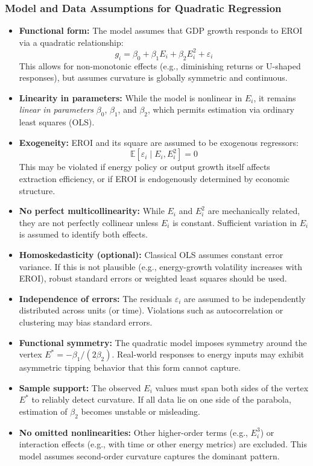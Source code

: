 \documentclass[a4paper,12pt]{article}
\begin{document}
\subsubsection*{Model and Data Assumptions for Quadratic Regression}
\begin{itemize}
    \item \textbf{Functional form:} The model assumes that GDP growth responds to EROI via a quadratic relationship:
    \[
        g_i = \beta_0 + \beta_1 E_i + \beta_2 E_i^2 + \varepsilon_i
    \]
    This allows for non-monotonic effects (e.g., diminishing returns or U-shaped responses), but assumes curvature is globally symmetric and continuous.

    \item \textbf{Linearity in parameters:} While the model is nonlinear in $E_i$, it remains \textit{linear in parameters} $\beta_0$, $\beta_1$, and $\beta_2$, which permits estimation via ordinary least squares (OLS).

    \item \textbf{Exogeneity:} EROI and its square are assumed to be exogenous regressors:
    \[
        \mathbb{E}[\varepsilon_i \mid E_i, E_i^2] = 0
    \]
    This may be violated if energy policy or output growth itself affects extraction efficiency, or if EROI is endogenously determined by economic structure.

    \item \textbf{No perfect multicollinearity:} While $E_i$ and $E_i^2$ are mechanically related, they are not perfectly collinear unless $E_i$ is constant. Sufficient variation in $E_i$ is assumed to identify both effects.

    \item \textbf{Homoskedasticity (optional):} Classical OLS assumes constant error variance. If this is not plausible (e.g., energy-growth volatility increases with EROI), robust standard errors or weighted least squares should be used.

    \item \textbf{Independence of errors:} The residuals $\varepsilon_i$ are assumed to be independently distributed across units (or time). Violations such as autocorrelation or clustering may bias standard errors.

    \item \textbf{Functional symmetry:} The quadratic model imposes symmetry around the vertex $E^* = -\beta_1 / (2\beta_2)$. Real-world responses to energy inputs may exhibit asymmetric tipping behavior that this form cannot capture.

    \item \textbf{Sample support:} The observed $E_i$ values must span both sides of the vertex $E^*$ to reliably detect curvature. If all data lie on one side of the parabola, estimation of $\beta_2$ becomes unstable or misleading.

    \item \textbf{No omitted nonlinearities:} Other higher-order terms (e.g., $E_i^3$) or interaction effects (e.g., with time or other energy metrics) are excluded. This model assumes second-order curvature captures the dominant pattern.
\end{itemize}
\end{document}
